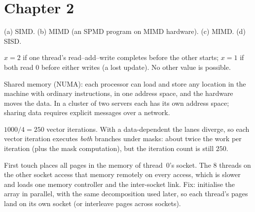 \section*{Chapter 2}
\begin{description}[leftmargin=1.2cm,labelwidth=1cm,itemsep=3pt]
  \item[2.1] (a) SIMD. (b) MIMD (an SPMD program on MIMD hardware). (c) MIMD. (d) SISD.
  \item[2.2] $x=2$ if one thread's read--add--write completes before the other starts; $x=1$ if both read $0$ before either writes (a lost update). No other value is possible.
  \item[2.3] Shared memory (NUMA): each processor can load and store any location in the machine with ordinary instructions, in one address space, and the hardware moves the data. In a cluster of two servers each has its own address space; sharing data requires explicit messages over a network.
  \item[2.4] $1000/4=250$ vector iterations. With a data-dependent  the lanes diverge, so each vector iteration executes \emph{both} branches under masks: about twice the work per iteration (plus the mask computation), but the iteration count is still $250$.
  \item[2.5] First touch places all pages in the memory of thread~0's socket. The $8$ threads on the other socket access that memory remotely on every access, which is slower and loads one memory controller and the inter-socket link. Fix: initialise the array in parallel, with the same decomposition used later, so each thread's pages land on its own socket (or interleave pages across sockets).
\end{description}

